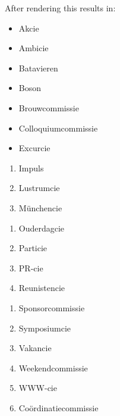 After rendering this results in: \\
\begin{itemize}
    \item{Akcie}
    \item{Ambicie}
    \item{Batavieren}
    \item{Boson}
\end{itemize}
\begin{itemize}
    \item{Brouwcommissie}
    \item{Colloquiumcommissie}
    \item{Excurcie}
\end{itemize}
\begin{enumerate}
    \item{Impuls}
    \item{Lustrumcie}
    \item{M\"unchencie}
\end{enumerate}
\begin{enumerate}
    \item{Ouderdagcie}
    \item{Particie}
    \item{PR-cie}
    \item{Reunistencie}
\end{enumerate}
\begin{enumerate}
    \item{Sponsorcommissie}
    \item{Symposiumcie}
    \item{Vakancie}
    \item{Weekendcommissie}
    \item{WWW-cie}
    \item{Co\"ordinatiecommissie}
\end{enumerate}
